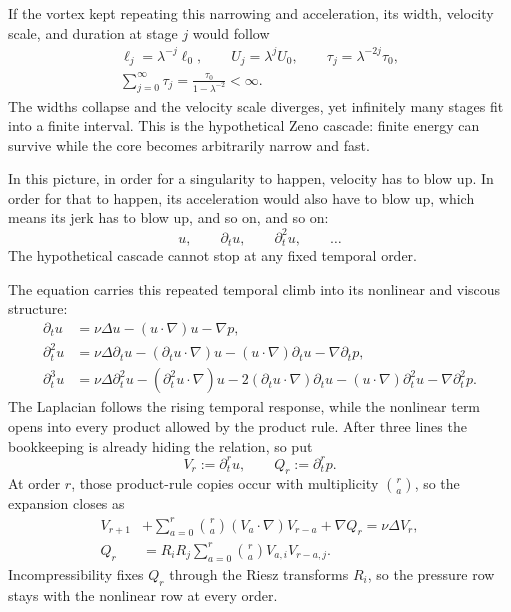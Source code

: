 If the vortex kept repeating this narrowing and acceleration, its width,
velocity scale, and duration at stage \(j\) would follow
\[
\begin{gathered}
 \ell_j=\lambda^{-j}\ell_0,
 \qquad
 U_j=\lambda^jU_0,
 \qquad
 \tau_j=\lambda^{-2j}\tau_0,
 \\
 \sum_{j=0}^{\infty}\tau_j
 =\frac{\tau_0}{1-\lambda^{-2}}<\infty.
\end{gathered}
\]
The widths collapse and the velocity scale diverges, yet infinitely many
stages fit into a finite interval.  This is the hypothetical Zeno cascade:
finite energy can survive while the core becomes arbitrarily narrow and fast.

In this picture, in order for a singularity to happen, velocity
has to blow up.  In order for that to happen, its acceleration would also have
to blow up, which means its jerk has to blow up, and so on, and so on:
\[
 u,\qquad \partial_tu,\qquad \partial_t^2u,\qquad\ldots
\]
The hypothetical cascade cannot stop at any fixed temporal order.

The equation carries this repeated temporal climb into its nonlinear and
viscous structure:
\[
\begin{aligned}
 \partial_tu
 &=\nu\Delta u-(u\!\cdot\nabla)u-\nabla p,\\
 \partial_t^2u
 &=\nu\Delta\partial_tu
   -(\partial_tu\!\cdot\nabla)u
   -(u\!\cdot\nabla)\partial_tu
   -\nabla\partial_tp,\\
 \partial_t^3u
 &=\nu\Delta\partial_t^2u
   -(\partial_t^2u\!\cdot\nabla)u
   -2(\partial_tu\!\cdot\nabla)\partial_tu
   -(u\!\cdot\nabla)\partial_t^2u
   -\nabla\partial_t^2p.
\end{aligned}
\]
The Laplacian follows the rising temporal response, while the nonlinear term
opens into every product allowed by the product rule.  After three lines the
bookkeeping is already hiding the relation, so put
\[
 V_r:=\partial_t^ru,
 \qquad
 Q_r:=\partial_t^rp.
\]
At order \(r\), those product-rule copies occur with multiplicity
\(\binom ra\), so the expansion closes as
\[
\begin{aligned}
 V_{r+1}
 &+\sum_{a=0}^{r}\binom ra
   (V_a\!\cdot\nabla)V_{r-a}
   +\nabla Q_r
   =\nu\Delta V_r,\\
 Q_r
 &=R_iR_j\sum_{a=0}^{r}\binom ra
   V_{a,i}V_{r-a,j}.
\end{aligned}
\]
Incompressibility fixes \(Q_r\) through the Riesz transforms \(R_i\), so the
pressure row stays with the nonlinear row at every order.

